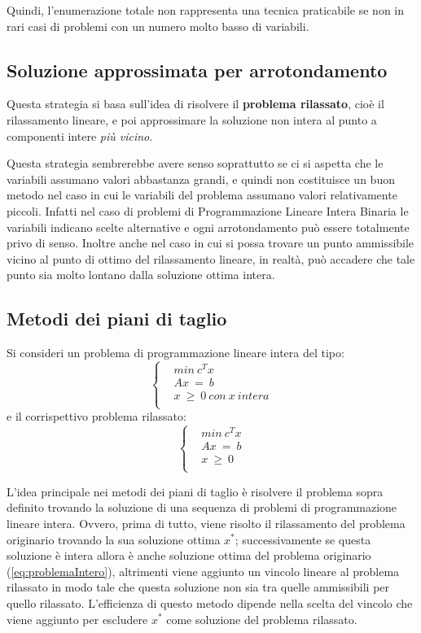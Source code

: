 Quindi, l'enumerazione totale non rappresenta una tecnica praticabile se non in rari casi di problemi con un numero molto basso di variabili.

\subsection{Soluzione approssimata per arrotondamento}
Questa strategia si basa sull'idea di risolvere il \textbf{problema rilassato}, cioè il rilassamento lineare, e poi approssimare la soluzione non intera al punto a componenti intere \textit{più vicino}.

Questa strategia sembrerebbe avere senso soprattutto se ci si aspetta che le variabili assumano valori abbastanza grandi, e quindi non costituisce un buon metodo nel caso in cui le variabili del problema assumano valori relativamente piccoli. Infatti nel caso di problemi di Programmazione Lineare Intera Binaria le variabili indicano scelte alternative e ogni arrotondamento può essere totalmente privo di senso. Inoltre anche nel caso in cui si possa trovare un punto ammissibile vicino al punto di ottimo del rilassamento lineare, in realtà, può accadere che tale punto sia molto lontano dalla soluzione ottima intera.

\subsection{Metodi dei piani di taglio}
Si consideri un problema di programmazione lineare intera del tipo:
\begin{equation}
\label{eq:problemaIntero}
\begin{cases}
& min ~ c^T x \\
& Ax ~ = ~ b \\
& x ~ \geq ~ 0 ~ con ~ x ~ intera \\ 
\end{cases}
\end{equation}
e il corrispettivo problema rilassato:
\begin{equation}
\label{eq:problemaInteroRilass}
\begin{cases}
& min ~ c^T x \\
& Ax ~ = ~ b \\
& x ~ \geq ~ 0 \\
\end{cases}
\end{equation}

L'idea principale nei metodi dei piani di taglio è risolvere il problema sopra definito trovando la soluzione di una sequenza di problemi di programmazione lineare intera.
Ovvero, prima di tutto, viene risolto il rilassamento del problema originario trovando la sua soluzione ottima $x^*$; successivamente se questa soluzione è intera allora è anche soluzione ottima del problema originario (\ref{eq:problemaIntero}), altrimenti viene aggiunto un vincolo lineare al problema rilassato in modo tale che questa soluzione non sia tra quelle ammissibili per quello rilassato.
L'efficienza di questo metodo dipende nella scelta del vincolo che viene aggiunto per escludere $x^*$ come soluzione del problema rilassato.

